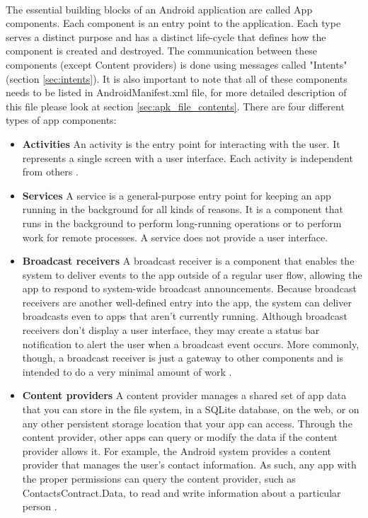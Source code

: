 \documentclass[../main.tex]{subfile}
\begin{document}
		\paragraph{} The essential building blocks of an Android application are called App components. Each component is an entry point to the application. Each type serves a distinct purpose and has a distinct life-cycle that defines how the component is created and destroyed. The communication between these components (except Content providers) is done using messages called "Intents" (section \ref{sec:intents}). It is also important to note that all of these components needs to be listed in AndroidManifest.xml file, for more detailed description of this file please look at section \ref{sec:apk_file_contents}. There are four different types of app components:
			\begin{itemize}
				\item \textbf{Activities} An activity is the entry point for interacting with the user. It represents a single screen with a user interface. Each activity is independent from others \cite{app_fundamentals}.
				\item \textbf{Services} A service is a general-purpose entry point for keeping an app running in the background for all kinds of reasons. It is a component that runs in the background to perform long-running operations or to perform work for remote processes. A service does not provide a user interface\cite{app_fundamentals}. 
				\item \textbf{Broadcast receivers} A broadcast receiver is a component that enables the system to deliver events to the app outside of a regular user flow, allowing the app to respond to system-wide broadcast announcements. Because broadcast receivers are another well-defined entry into the app, the system can deliver broadcasts even to apps that aren't currently running. Although broadcast receivers don't display a user interface, they may create a status bar notification to alert the user when a broadcast event occurs. More commonly, though, a broadcast receiver is just a gateway to other components and is intended to do a very minimal amount of work \cite{app_fundamentals}.
				\item \textbf{Content providers} A content provider manages a shared set of app data that you can store in the file system, in a SQLite database, on the web, or on any other persistent storage location that your app can access. Through the content provider, other apps can query or modify the data if the content provider allows it. For example, the Android system provides a content provider that manages the user's contact information. As such, any app with the proper permissions can query the content provider, such as ContactsContract.Data, to read and write information about a particular person \cite{app_fundamentals}.
			\end{itemize}
\end{document}
